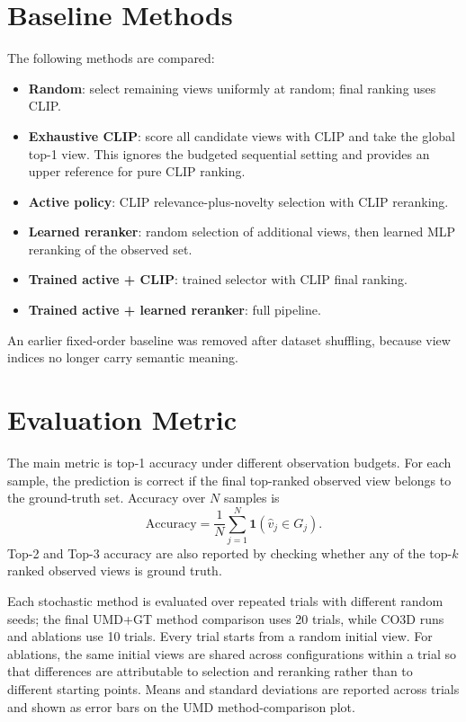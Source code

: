 \section{Baseline Methods}

The following methods are compared:

\begin{itemize}
    \item \textbf{Random}: select remaining views uniformly at random; final ranking uses CLIP.
    \item \textbf{Exhaustive CLIP}: score all candidate views with CLIP and take the global top-1 view. This ignores the budgeted sequential setting and provides an upper reference for pure CLIP ranking.
    \item \textbf{Active policy}: CLIP relevance-plus-novelty selection with CLIP reranking.
    \item \textbf{Learned reranker}: random selection of additional views, then learned MLP reranking of the observed set.
    \item \textbf{Trained active + CLIP}: trained selector with CLIP final ranking.
    \item \textbf{Trained active + learned reranker}: full pipeline.
\end{itemize}

An earlier fixed-order baseline was removed after dataset shuffling, because view indices no longer carry semantic meaning.

\section{Evaluation Metric}

The main metric is top-1 accuracy under different observation budgets. For each sample, the prediction is correct if the final top-ranked observed view belongs to the ground-truth set. Accuracy over \(N\) samples is
\[
\mathrm{Accuracy} = \frac{1}{N} \sum_{j=1}^{N} \mathbf{1}(\hat{v}_j \in G_j).
\]
Top-2 and Top-3 accuracy are also reported by checking whether any of the top-\(k\) ranked observed views is ground truth.

Each stochastic method is evaluated over repeated trials with different random seeds; the final UMD+GT method comparison uses 20 trials, while CO3D runs and ablations use 10 trials. Every trial starts from a random initial view. For ablations, the same initial views are shared across configurations within a trial so that differences are attributable to selection and reranking rather than to different starting points. Means and standard deviations are reported across trials and shown as error bars on the UMD method-comparison plot.

